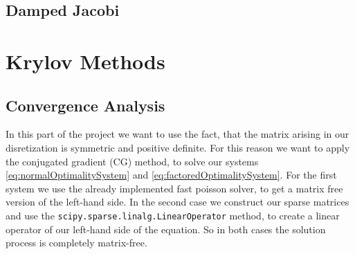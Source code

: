 \documentclass{amsart}
\theoremstyle{definition}
\theoremstyle{remark}
\numberwithin{equation}{section}
\begin{document}
\subsection{Damped Jacobi}

\newpage
\section{Krylov Methods}

\subsection{Convergence Analysis}
In this part of the project we want to use the fact, that the matrix arising in our disretization is symmetric and positive definite. For this reason we 
want to apply the conjugated gradient (CG) method, to solve our systems \eqref{eq:normalOptimalitySystem} and \eqref{eq:factoredOptimalitySystem}.
For the first system we use the already implemented fast poisson solver, to get a matrix free version of the left-hand side. In the second case we 
construct our sparse matrices and use the \texttt{scipy.sparse.linalg.LinearOperator} method, to create a linear operator of our left-hand side of the 
equation. So in both cases the solution process is completely matrix-free.
\end{document}
